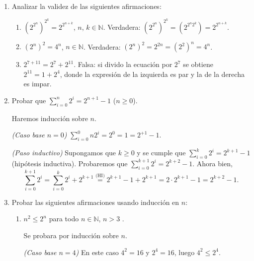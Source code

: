 \begin{enumerate}
    
    \item Analizar la validez de las siguientes afirmaciones:
    \begin{enumerate}
        \item  $(2^{2^n})^{2^k} = 2^{2^{n+k}}$,  $n$, $k \in {\mathbb N}$. 	\rta  Verdadera: $(2^{2^n})^{2^k} =(2^{2^n2^k}) =  2^{2^{n+k}}$.
        \item $(2^n)^2 = 4^n$, $n \in {\mathbb N}$. \rta  Verdadera: $(2^n)^2 = 2^{2n} =(2^2)^n= 4^n$.
        \item $2^{7+11} = 2^7 + 2^{11}$. Falsa: si divido la ecuación por $2^7$ se obtiene $2^{11} = 1 + 2^{4}$,  donde la expresión de la izquierda es par y la de la derecha es impar. 
    \end{enumerate}

    
    \item\label{ej-suma-2-ala-n} Probar que $\sum_{i=0}^n 2^i = 2^{n+1} -1$ ($n \ge 0$). 
    
    \rta Haremos inducción sobre $n$. 
    
    \textit{(Caso base $n=0$) }  $\sum_{i=0}^0n 2^i = 2^0 = 1 = 2^{+1} -1$.
    
    \textit{(Paso inductivo) } Supongamos que $k\ge 0$ y se cumple que  $\sum_{i=0}^k 2^i = 2^{k+1} -1$ (hipótesis inductiva). Probaremos que  $\sum_{i=0}^{k+1} 2^i = 2^{k+2} -1$. Ahora bien, 
    \begin{equation*}
    \sum_{i=0}^{k+1} 2^i = \sum_{i=0}^{k} 2^i + 2^{k+1} \overset{\text{(HI)}}{=}  2^{k+1} -1 + 2^{k+1} = 2 \cdot 2^{k+1} -1 = 2^{k+2} -1.
    \end{equation*}
    
    
    \item Probar las siguientes afirmaciones usando inducción en $n$:
    \begin{enumerate}
        \item $n^2\leq 2^n$ para todo $n\in{\mathbb N}$, $n>3$ .
        
        \rta  Se probara por inducción sobre $n$. 
        
        \textit{(Caso base $n=4$) } En  este caso $4^2 = 16$ y $2^4 = 16$, luego $4^2 \le 2^4$.
        

\end{enumerate}
\end{enumerate}
